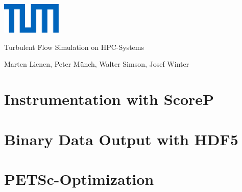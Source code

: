 \documentclass[11pt]{beamer}
\begin{document}
\begin{frame}
  \begin{center}
    \includegraphics[width=80pt]{logo}\\

    \vspace{4em}

    {\LARGE Turbulent Flow Simulation on HPC-Systems}

    \vspace{2em}

    {\small Marten Lienen, Peter M\"unch, Walter Simson, Josef Winter}
  \end{center}
\end{frame}

\section{Instrumentation with ScoreP}

\section{Binary Data Output with HDF5}

\section{PETSc-Optimization}
\end{document}
